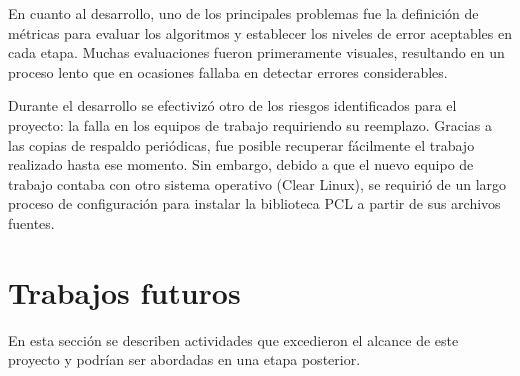 En cuanto al desarrollo, uno de los principales problemas fue la definición de métricas
para evaluar los algoritmos y establecer los niveles de error aceptables en cada etapa.
Muchas evaluaciones fueron primeramente visuales, resultando en un proceso lento
que en ocasiones fallaba en detectar errores considerables.

Durante el desarrollo se efectivizó otro de los riesgos identificados para el proyecto:
la falla en los equipos de trabajo requiriendo su reemplazo.
Gracias a las copias de respaldo periódicas, fue posible recuperar fácilmente el trabajo realizado hasta ese momento.
Sin embargo, debido a que el nuevo equipo de trabajo contaba con otro sistema operativo (Clear Linux),
se requirió de un largo proceso de configuración para instalar la biblioteca PCL a partir de sus archivos fuentes.

%



\section{Trabajos futuros}

En esta sección se describen actividades que excedieron el alcance de este proyecto
y podrían ser abordadas en una etapa posterior.

